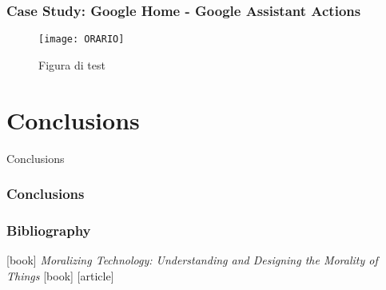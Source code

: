 \documentclass{beamer}
\begin{document}
\begin{frame}
\frametitle{Case Study: Google Home - Google Assistant Actions}

\begin{figure}
	\centering
	\texttt{[image: ORARIO]}
	\caption{Figura di test}
	\label{fig:orario}
\end{figure}


\end{frame}

\section{Conclusions}

\begin{frame}
\begin{center} 
	 Conclusions
\end{center}
\end{frame}

\begin{frame}
\frametitle{Conclusions}
\end{frame}

\begin{frame}
\frametitle{Bibliography}
\begin{thebibliography}{9}
	[book]
	\textit{Moralizing Technology: Understanding and Designing the Morality of Things}
	[book]
	[article]

\end{thebibliography}
\end{frame}
\end{document}
